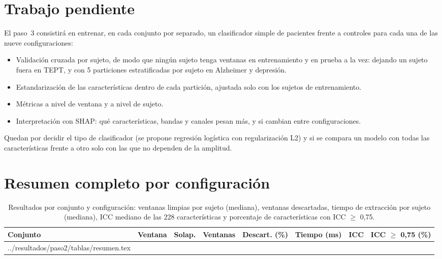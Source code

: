 \documentclass[11pt,a4paper]{article}
\makeatletter
\newcommand{\tabla}[1]{\@@input ../resultados/paso2/tablas/#1 }
\makeatother
\begin{document}
\section{Trabajo pendiente}
\label{sec:pendiente}
El paso~3 consistirá en entrenar, en cada conjunto por separado, un clasificador simple de pacientes frente a controles para cada una de las nueve configuraciones:
\begin{itemize}
  \item Validación cruzada por sujeto, de modo que ningún sujeto tenga ventanas en entrenamiento y en prueba a la vez: dejando un sujeto fuera en TEPT, y con 5 particiones estratificadas por sujeto en Alzheimer y depresión.
  \item Estandarización de las características dentro de cada partición, ajustada solo con los sujetos de entrenamiento.
  \item Métricas a nivel de ventana y a nivel de sujeto.
  \item Interpretación con SHAP: qué características, bandas y canales pesan más, y si cambian entre configuraciones.
\end{itemize}
Quedan por decidir el tipo de clasificador (se propone regresión logística con regularización L2) y si se compara un modelo con todas las características frente a otro solo con las que no dependen de la amplitud.




\appendix
\section{Resumen completo por configuración}

\begin{table}[ht]
\centering\small
\caption{Resultados por conjunto y configuración: ventanas limpias por sujeto (mediana), ventanas descartadas, tiempo de extracción por sujeto (mediana), ICC mediano de las 228 características y porcentaje de características con ICC $\ge$ 0,75.}
\label{tab:resumen}
\begin{tabular}{@{}lllrrrrr@{}}
\toprule
Conjunto & Ventana & Solap. & Ventanas & Descart. (\%) & Tiempo (ms) & ICC & ICC $\ge$ 0,75 (\%) \\
\midrule
\tabla{resumen.tex}
\bottomrule
\end{tabular}
\end{table}
\end{document}
